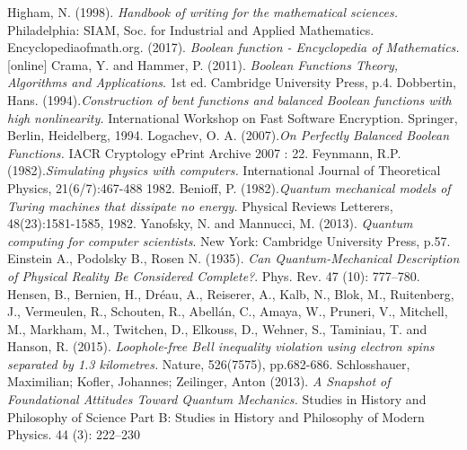 \documentclass[12pt,a4paper,openright]{report}
\begin{document}
 



\begin{thebibliography}{20}
     Higham, N. (1998). \emph{Handbook of writing for the mathematical sciences.} Philadelphia: SIAM, Soc. for Industrial and Applied Mathematics.
     Encyclopediaofmath.org. (2017). \emph{Boolean function - Encyclopedia of Mathematics.} [online] 
     Crama, Y. and Hammer, P. (2011). \emph{Boolean Functions Theory, Algorithms and Applications}. 1st ed. Cambridge University Press, p.4.
     Dobbertin, Hans. (1994).\emph{Construction of bent functions and balanced Boolean functions with high nonlinearity.} International Workshop on Fast Software Encryption. Springer, Berlin, Heidelberg, 1994.
     Logachev, O. A. (2007).\emph{On Perfectly Balanced Boolean Functions.} IACR Cryptology ePrint Archive 2007 : 22.
     Feynmann, R.P. (1982).\emph{Simulating physics with computers.} International Journal of Theoretical Physics, 21(6/7):467-488 1982.
     Benioff, P. (1982).\emph{Quantum mechanical models of Turing machines that dissipate no energy.} Physical Reviews Letterers, 48(23):1581-1585, 1982.
     Yanofsky, N. and Mannucci, M. (2013). \emph{Quantum computing for computer scientists}. New York: Cambridge University Press, p.57.
     Einstein A., Podolsky B., Rosen N. (1935). \emph{Can Quantum-Mechanical Description of Physical Reality Be Considered Complete?}. Phys. Rev. 47 (10): 777–780. 
     Hensen, B., Bernien, H., Dréau, A., Reiserer, A., Kalb, N., Blok, M., Ruitenberg, J., Vermeulen, R., Schouten, R., Abellán, C., Amaya, W., Pruneri, V., Mitchell, M., Markham, M., Twitchen, D., Elkouss, D., Wehner, S., Taminiau, T. and Hanson, R. (2015). \emph{Loophole-free Bell inequality violation using electron spins separated by 1.3 kilometres.} Nature, 526(7575), pp.682-686.
     Schlosshauer, Maximilian; Kofler, Johannes; Zeilinger, Anton (2013). \emph{A Snapshot of Foundational Attitudes Toward Quantum Mechanics.} Studies in History and Philosophy of Science Part B: Studies in History and Philosophy of Modern Physics. 44 (3): 222–230
\end{thebibliography}
\end{document}
